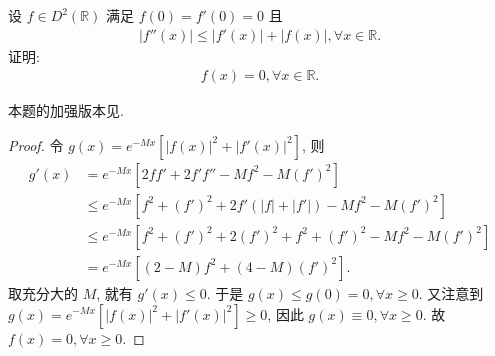 \documentclass[../../main.tex]{subfiles}
\begin{document}
\begin{example}
设 $f\in D^2(\mathbb{R})$ 满足 $f(0)=f'(0)=0$ 且
\begin{align*}
|f''(x)|\leqslant|f'(x)|+|f(x)|,\forall x\in\mathbb{R}.
\end{align*}
证明:
\begin{align*}
f(x)=0,\forall x\in\mathbb{R}.
\end{align*} 
\end{example}
\begin{note}
本题的加强版本见.
\end{note}
\begin{proof}
令 $g(x)=e^{-Mx}\left[|f(x)|^2+|f'(x)|^2\right]$, 则
\begin{align*}
g'(x)&=e^{-Mx}\left[2ff'+2f'f''-Mf^2-M(f')^2\right]\\
&\leqslant e^{-Mx}\left[f^2+(f')^2+2f'\left(|f|+|f'|\right)-Mf^2-M(f')^2\right]\\
&\leqslant e^{-Mx}\left[f^2+(f')^2+2(f')^2+f^2+(f')^2-Mf^2-M(f')^2\right]\\
&=e^{-Mx}\left[(2 - M)f^2+(4 - M)(f')^2\right].
\end{align*}
取充分大的 $M$, 就有 $g'(x)\leqslant0$. 于是 $g(x)\leqslant g(0)=0,\forall x\geqslant0$.
又注意到 $g(x)=e^{-Mx}\left[|f(x)|^2+|f'(x)|^2\right]\geqslant0$, 因此 $g(x)\equiv0,\forall x\geqslant0$.
故 $f(x)=0,\forall x\geqslant0$. 
\end{proof}
\end{document}

